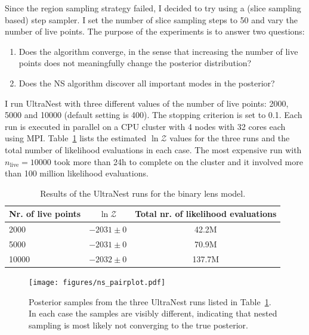 \documentclass[12pt,dvipsnames]{report}
\newcommand{\ssf}[1]{\textsf{#1}}
\begin{document}
Since the region sampling strategy failed, I decided to try using a (slice sampling based)
step sampler.
I set the number of slice sampling steps to 50 and vary the number of live points. 
The purpose of the experiments is to answer two questions:
\begin{enumerate}
    \item Does the algorithm converge, in the sense that increasing the number of live points
    does not meaningfully change the posterior distribution?
    \item Does the NS algorithm discover all important modes in the posterior?
\end{enumerate}
I run \ssf{UltraNest} with three different values of the number of live points: 2000, 5000 and
10000 (default setting is 400). The stopping criterion is set to 0.1. 
Each run is executed in parallel on a CPU cluster with 4 nodes with 32 cores each using MPI.
Table~\ref{tab:results_ns} lists the estimated  $\ln\mathcal{Z}$ values for the three 
runs and the total number of likelihood evaluations in each case. 
The most expensive run 
with $n_\mathrm{live}=10000$ took more than 24h to complete on the cluster and it involved 
more than 100 million likelihood evaluations. 
\begin{table}[h!]
\centering
\begin{tabular}{lcc}
 \toprule
Nr. of live points& $\ln\mathcal{Z}$& Total nr. of likelihood evaluations\\
 \midrule
2000 & $-2031\pm 0$ & 42.2M\\
5000 & $-2031\pm 0$ & 70.9M\\
10000 & $-2032 \pm 0$ & 137.7M\\
 \bottomrule
\end{tabular}
\caption{ Results of the \ssf{UltraNest} runs for the binary lens model.}
\label{tab:results_ns}
\end{table}

\begin{figure}[t]
\begin{centering}
        \texttt{[image: figures/ns\_pairplot.pdf]}
        \caption{
            Posterior samples from the three \ssf{UltraNest} runs listed in 
            Table~\ref{tab:results_ns}. In each case the samples are visibly different,
            indicating that nested sampling is most likely not converging to the true posterior.
        }
            \label{fig:ns_pairplot}
    \end{centering}
\end{figure}
\end{document}
